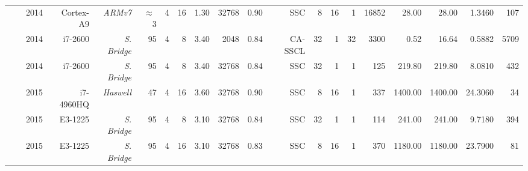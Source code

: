 \begin{table}[htp]
{{\begin{tabular}{|r|r r|r r r r r r|r r|r r r r|r r|r r r|}
                                                                 & \cite{LeGal2014}     & 2014          & Cortex-A9          & \textit{ARMv7}     & $\approx~$3  & {\color{Paired-1}4} &  16           & 1.30           & 32768    & 0.90     &      SSC           &  8            &                    16  &  1                &                   16852  &                    28.00  &   28.00       &  1.3460        &    107             \\
                                                                 & \cite{Sarkis2014b}   & 2014          & i7-2600            & \textit{S. Bridge} &          95  & {\color{Paired-1}4} &   8           & 3.40           &  2048    & 0.84     &   CA-SSCL          & 32            &                     1  & 32                &                    3300  &                     0.52  &   16.64       &  0.5882        &   5709             \\
                                                                 & \cite{Sarkis2014}    & 2014          & i7-2600            & \textit{S. Bridge} &          95  & {\color{Paired-1}4} &   8           & 3.40           & 32768    & 0.84     &      SSC           & 32            &                     1  &  1                &                     125  &                   219.80  &  219.80       &  8.0810        &    432             \\
                                                                 & \cite{LeGal2015a}    & 2015          & i7-4960HQ          & \textit{Haswell}   &          47  & {\color{Paired-1}4} &  16           & 3.60           & 32768    & 0.90     &      SSC           &  8            &                    16  &  1                &                     337  &                  1400.00  & 1400.00       & 24.3060        &     34             \\
                                                                 & \cite{Cassagne2015c} & 2015          & E3-1225            & \textit{S. Bridge} &          95  & {\color{Paired-1}4} &   8           & 3.10           & 32768    & 0.84     &      SSC           & 32            &                     1  &  1                &                     114  &                   241.00  &  241.00       &  9.7180        &    394             \\
                                                                 & \cite{Cassagne2015c} & 2015          & E3-1225            & \textit{S. Bridge} &          95  & {\color{Paired-1}4} &  16           & 3.10           & 32768    & 0.83     &      SSC           &  8            &                    16  &  1                &                     370  &                  1180.00  & 1180.00       & 23.7900        &     81             \\

\end{tabular}}}
\end{table}
